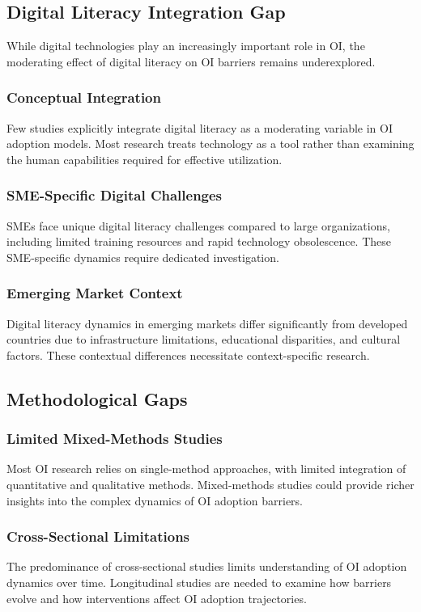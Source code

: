 \subsection{Digital Literacy Integration Gap}

While digital technologies play an increasingly important role in OI, the moderating effect of digital literacy on OI barriers remains underexplored.

\subsubsection{Conceptual Integration}
Few studies explicitly integrate digital literacy as a moderating variable in OI adoption models. Most research treats technology as a tool rather than examining the human capabilities required for effective utilization.

\subsubsection{SME-Specific Digital Challenges}
SMEs face unique digital literacy challenges compared to large organizations, including limited training resources and rapid technology obsolescence. These SME-specific dynamics require dedicated investigation.

\subsubsection{Emerging Market Context}
Digital literacy dynamics in emerging markets differ significantly from developed countries due to infrastructure limitations, educational disparities, and cultural factors. These contextual differences necessitate context-specific research.

\subsection{Methodological Gaps}

\subsubsection{Limited Mixed-Methods Studies}
Most OI research relies on single-method approaches, with limited integration of quantitative and qualitative methods. Mixed-methods studies could provide richer insights into the complex dynamics of OI adoption barriers.

\subsubsection{Cross-Sectional Limitations}
The predominance of cross-sectional studies limits understanding of OI adoption dynamics over time. Longitudinal studies are needed to examine how barriers evolve and how interventions affect OI adoption trajectories.

